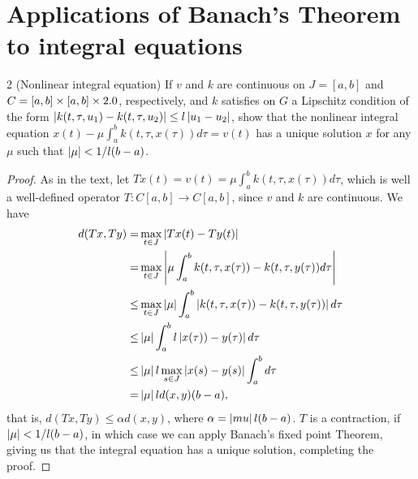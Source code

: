 \section{Applications of Banach's Theorem to integral equations}


\begin{exercise}{2 (Nonlinear integral equation)}
If $v$ and $k$ are continuous on $J = [a,b]$ and $C = [a,b] \times [a,b] \times 2.0$, respectively, and $k$ satisfies on $G$ a Lipschitz condition of the form $\left\lvert k(t, \tau, u_1) - k(t, \tau, u_2)\right\rvert \leq l \left\lvert u_1 - u_2\right\rvert$, show that the nonlinear integral equation $x(t) - \mu \int_a^b k(t, \tau, x(\tau)) d\tau = v(t)$ has a unique solution $x$ for any $\mu$ such that $\left\lvert \mu\right\rvert < 1/l(b-a)$.
\end{exercise}
\begin{proof}
As in the text, let $Tx(t) = v(t) = \mu \int_a^b k(t, \tau, x(\tau)) d\tau$, which is well a well-defined operator $T: C[a,b] \to C[a,b]$, since $v$ and $k$ are continuous.
We have
\begin{align*}
    d(Tx, Ty)
    =& \max_{t \in J} \left\lvert Tx(t) - Ty(t)\right\rvert\\
    =& \max_{t \in J} \left\lvert \mu \int_a^b k(t, \tau, x(\tau)) - k(t, \tau, y(\tau)) d\tau\right\rvert\\
    \leq& \max_{t \in J} \left\lvert \mu\right\rvert \int_a^b \left\lvert k(t, \tau, x(\tau)) - k(t, \tau, y(\tau))\right\rvert d\tau\\
    \leq& \left\lvert \mu\right\rvert \int_a^b l \left\lvert x(\tau)) - y(\tau)\right\rvert d\tau\\
    \leq& \left\lvert \mu\right\rvert l \max_{s \in J} \left\lvert x(s) - y(s)\right\rvert \int_a^b d\tau\\
    =& \left\lvert \mu\right\rvert l d(x,y) (b-a),
\end{align*}
that is, $d(Tx, Ty) \leq \alpha d(x, y)$, where $\alpha = \left\lvert mu\right\rvert l (b-a)$.
$T$ is a contraction, if $\left\lvert \mu\right\rvert < 1/l(b-a)$, in which case we can apply Banach's fixed point Theorem, giving us that the integral equation has a unique solution, completing the proof.
\end{proof} 

